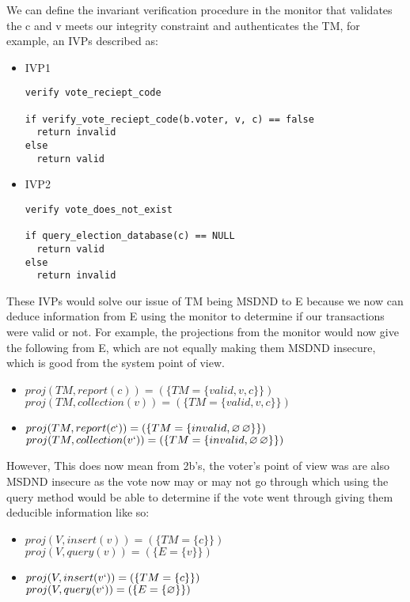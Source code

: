 \documentclass[journal,onecolumn]{IEEEtran}
\begin{document}
\begin{enumerate}
    We can define the invariant verification procedure in the monitor that validates the c and v meets our integrity constraint and authenticates the TM, for example, an IVPs described as:\\

\begin{itemize}
  \item IVP1
\begin{lstlisting}
verify vote_reciept_code

if verify_vote_reciept_code(b.voter, v, c) == false
  return invalid
else
  return valid
\end{lstlisting}

  \item IVP2
\begin{lstlisting}
verify vote_does_not_exist

if query_election_database(c) == NULL
  return valid
else
  return invalid
\end{lstlisting}
\end{itemize}

These IVPs would solve our issue of TM being MSDND to E because we now can deduce information from E using the monitor to determine if our transactions were valid or not. For example, the projections from the monitor would now give the following from E, which are not equally making them MSDND insecure, which is good from the system point of view.

\begin{itemize}
  \item $proj(TM, report(c)) = (\{TM = \{valid, v, c\}\})$ \\
  $proj(TM, collection(v)) = (\{TM = \{valid, v, c\}\})$ \\
  \item $proj(TM, report(c`)) = (\{TM = \{invalid, \varnothing\, \varnothing\}\})$ \\
  $proj(TM, collection(v`)) = (\{TM = \{invalid, \varnothing\, \varnothing\}\})$ \\
\end{itemize}

However, This does now mean from 2b's, the voter's point of view was are also MSDND insecure as the vote now may or may not go through which using the query method would be able to determine if the vote went through giving them deducible information like so: \\

\begin{itemize}
  \item $proj(V, insert(v)) = (\{TM = \{c\}\})$ \\
  $proj(V, query(v)) = (\{E = \{v\}\})$ \\
  \item $proj(V, insert(v`)) = (\{TM = \{c\}\})$ \\
  $proj(V, query(v`)) = (\{E = \{\varnothing\}\})$ \\
\end{itemize}

\end{enumerate}
\end{document}
